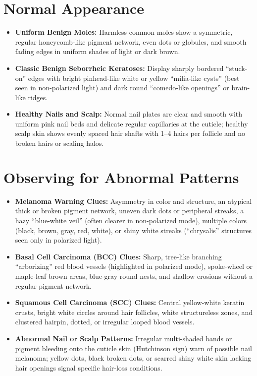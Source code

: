 \section{Normal Appearance}
\begin{itemize}
\item \textbf{Uniform Benign Moles:} Harmless common moles show a symmetric, regular honeycomb-like pigment network, even dots or globules, and smooth fading edges in uniform shades of light or dark brown.
\item \textbf{Classic Benign Seborrheic Keratoses:} Display sharply bordered ``stuck-on'' edges with bright pinhead-like white or yellow ``milia-like cysts'' (best seen in non-polarized light) and dark round ``comedo-like openings'' or brain-like ridges.
\item \textbf{Healthy Nails and Scalp:} Normal nail plates are clear and smooth with uniform pink nail beds and delicate regular capillaries at the cuticle; healthy scalp skin shows evenly spaced hair shafts with 1--4 hairs per follicle and no broken hairs or scaling halos.
\end{itemize}

\section{Observing for Abnormal Patterns}
\begin{itemize}
\item \textbf{Melanoma Warning Clues:} Asymmetry in color and structure, an atypical thick or broken pigment network, uneven dark dots or peripheral streaks, a hazy ``blue-white veil'' (often clearer in non-polarized mode), multiple colors (black, brown, gray, red, white), or shiny white streaks (``chrysalis'' structures seen only in polarized light).
\item \textbf{Basal Cell Carcinoma (BCC) Clues:} Sharp, tree-like branching ``arborizing'' red blood vessels (highlighted in polarized mode), spoke-wheel or maple-leaf brown areas, blue-gray round nests, and shallow erosions without a regular pigment network.
\item \textbf{Squamous Cell Carcinoma (SCC) Clues:} Central yellow-white keratin crusts, bright white circles around hair follicles, white structureless zones, and clustered hairpin, dotted, or irregular looped blood vessels.
\item \textbf{Abnormal Nail or Scalp Patterns:} Irregular multi-shaded bands or pigment bleeding onto the cuticle skin (Hutchinson sign) warn of possible nail melanoma; yellow dots, black broken dots, or scarred shiny white skin lacking hair openings signal specific hair-loss conditions.
\end{itemize}

